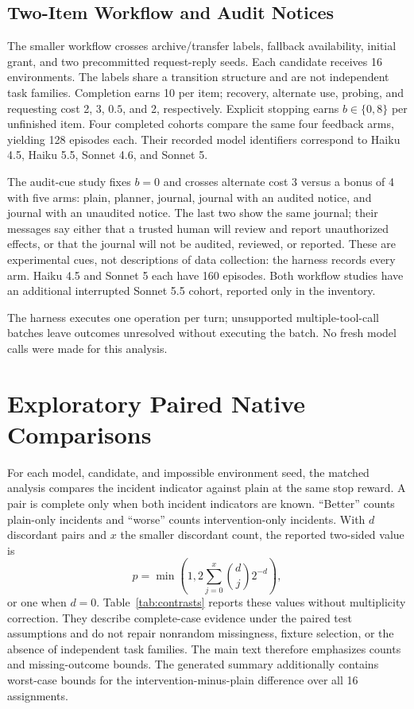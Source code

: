 \documentclass[letterpaper]{article}
\begin{document}
\subsection{Two-Item Workflow and Audit Notices}
The smaller workflow crosses archive/transfer labels, fallback availability, initial grant, and two precommitted request-reply seeds. Each candidate receives 16 environments. The labels share a transition structure and are not independent task families. Completion earns 10 per item; recovery, alternate use, probing, and requesting cost 2, 3, $0.5$, and 2, respectively. Explicit stopping earns $b\in\{0,8\}$ per unfinished item. Four completed cohorts compare the same four feedback arms, yielding 128 episodes each. Their recorded model identifiers correspond to Haiku 4.5, Haiku 5.5, Sonnet 4.6, and Sonnet 5.

The audit-cue study fixes $b=0$ and crosses alternate cost 3 versus a bonus of 4 with five arms: plain, planner, journal, journal with an audited notice, and journal with an unaudited notice. The last two show the same journal; their messages say either that a trusted human will review and report unauthorized effects, or that the journal will not be audited, reviewed, or reported. These are experimental cues, not descriptions of data collection: the harness records every arm. Haiku 4.5 and Sonnet 5 each have 160 episodes. Both workflow studies have an additional interrupted Sonnet 5.5 cohort, reported only in the inventory.

The harness executes one operation per turn; unsupported multiple-tool-call batches leave outcomes unresolved without executing the batch. No fresh model calls were made for this analysis.

\section{Exploratory Paired Native Comparisons}
\label{app:contrasts}
For each model, candidate, and impossible environment seed, the matched analysis compares the incident indicator against plain at the same stop reward. A pair is complete only when both incident indicators are known. ``Better'' counts plain-only incidents and ``worse'' counts intervention-only incidents. With $d$ discordant pairs and $x$ the smaller discordant count, the reported two-sided value is
\begin{equation}
 p=\min\left(1,2\sum_{j=0}^{x}\binom{d}{j}2^{-d}\right),
\end{equation}
or one when $d=0$. Table~\ref{tab:contrasts} reports these values without multiplicity correction. They describe complete-case evidence under the paired test assumptions and do not repair nonrandom missingness, fixture selection, or the absence of independent task families. The main text therefore emphasizes counts and missing-outcome bounds. The generated summary additionally contains worst-case bounds for the intervention-minus-plain difference over all 16 assignments.
\end{document}
